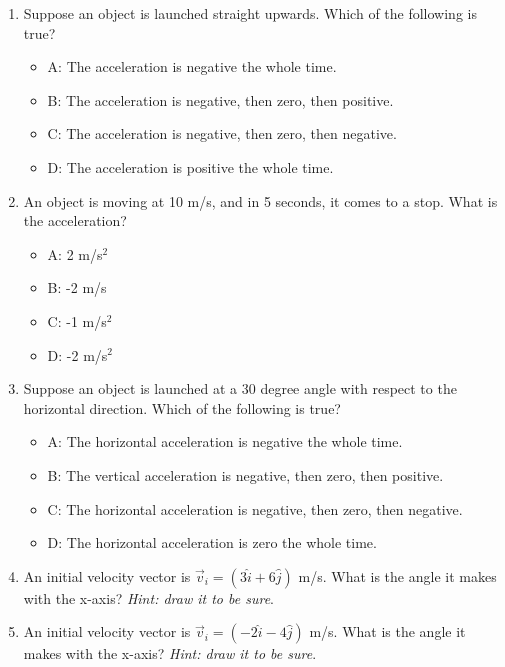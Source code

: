 \documentclass{article}
\begin{document}
\begin{enumerate}
\item Suppose an object is launched straight upwards.  Which of the following is true?
\begin{itemize}
\item A: The acceleration is negative the whole time.
\item B: The acceleration is negative, then zero, then positive.
\item C: The acceleration is negative, then zero, then negative.
\item D: The acceleration is positive the whole time.
\end{itemize}
\item An object is moving at 10 m/s, and in 5 seconds, it comes to a stop.  What is the acceleration?
\begin{itemize}
\item A: 2 m/s$^2$
\item B: -2 m/s
\item C: -1 m/s$^2$
\item D: -2 m/s$^2$
\end{itemize}
\item Suppose an object is launched at a 30 degree angle with respect to the horizontal direction.  Which of the following is true?
\begin{itemize}
\item A: The horizontal acceleration is negative the whole time.
\item B: The vertical acceleration is negative, then zero, then positive.
\item C: The horizontal acceleration is negative, then zero, then negative.
\item D: The horizontal acceleration is zero the whole time.
\end{itemize}
\item An initial velocity vector is $\vec{v}_i = (3\hat{i}+6\hat{j})$ m/s.  What is the angle it makes with the x-axis?  \textit{Hint: draw it to be sure}. \\ \vspace{2cm}
\item An initial velocity vector is $\vec{v}_i = (-2\hat{i}-4\hat{j})$ m/s.  What is the angle it makes with the x-axis?  \textit{Hint: draw it to be sure}. \\ \vspace{2cm}
\end{enumerate}
\end{document}
